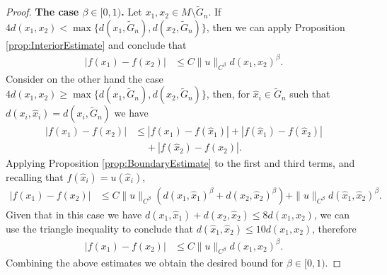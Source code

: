 \documentclass[11pt,reqno]{amsart}
\numberwithin{equation}{section}
\theoremstyle{plain}
\begin{document}
\begin{proof}
  \textbf{The case $\beta \in [0,1)$.}  Let $x_1,x_2\in M \setminus \tilde G_n$. If $4d(x_1,x_2) < \max\{d(x_1,\tilde G_n),d(x_2,\tilde G_n)\}$, then we can apply Proposition \ref{prop:InteriorEstimate} and conclude that
  \begin{align*}
    |f(x_1)-f(x_2)| & \leq C\|u\|_{C^\beta}d(x_1,x_2)^{\beta}.
  \end{align*}
  Consider on the other hand the case $4d(x_1,x_2)\geq \max\{d(x_1,\tilde G_n),d(x_2,\tilde G_n)\}$, then, for $\hat x_i\in \tilde G_n$ such that $d(x_i,\hat x_i)=d(x_i,\tilde G_n)$ we have
  \begin{align*}
    |f(x_1)-f(x_2)| & \leq |f(x_1)-f(\hat x_1)|+|f(\hat x_1)-f(\hat x_2)|\\
	  & \;\;\;\;+ |f(\hat x_2)-f(x_2)|.
  \end{align*}	  
  Applying Proposition \ref{prop:BoundaryEstimate} to the first and third terms, and recalling that $f(\hat x_i)=u(\hat x_i)$,
  \begin{align*}
    |f(x_1)-f(x_2)| & \leq C\|u\|_{C^\beta}(d(x_1,\hat x_1)^\beta+d(x_2,\hat x_2)^\beta)+\|u\|_{C^\beta}d(\hat x_1,\hat x_2)^\beta.
  \end{align*}	  
  Given that in this case we have $d(x_1,\hat x_1)+d(x_2,\hat x_2)\leq 8d(x_1,x_2)$, we can use the triangle inequality to conclude that $d(\hat x_1,\hat x_2) \leq 10d(x_1,x_2)$, therefore
  \begin{align*}
    |f(x_1)-f(x_2)| & \leq C\|u\|_{C^\beta}d(x_1,x_2)^\beta.
  \end{align*}
  Combining the above estimates we obtain the desired bound for $\beta \in [0,1)$. 
  

\end{proof}
\end{document}
